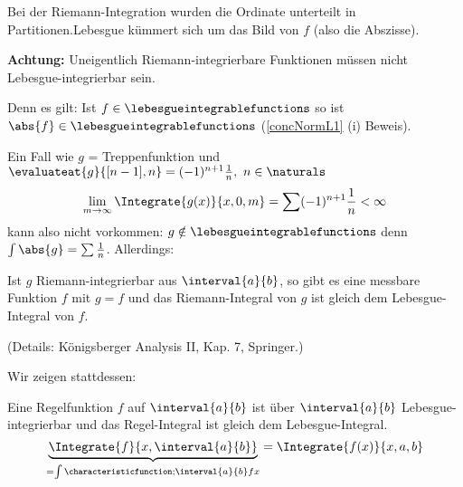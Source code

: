 \begin{erinnerung*}
  Bei der Riemann-Integration wurden die Ordinate unterteilt in Partitionen.Lebesgue kümmert sich um das Bild von \(f\) (also die Abszisse).
\end{erinnerung*}

\textbf{Achtung:} Uneigentlich Riemann-integrierbare Funktionen müssen nicht Lebesgue-integrierbar sein.

Denn es gilt: Ist \(f\in \lebesgueintegrablefunctions\) so ist \(\abs{f}\in \lebesgueintegrablefunctions\) (\ref{concNormL1} (i) Beweis).

Ein Fall wie \(g\) = Treppenfunktion und \(\evaluateat{g}{[n-1],n}=(-1)^{n+1}\frac{1}{n},\ n\in\naturals\)
\begin{equation*}
    \lim_{m\to\infty}\Integrate{g(x)}{x,0,m}=\sum(-1)^{n+1}\frac{1}{n}< \infty 
\end{equation*}
kann also nicht vorkommen: \(g\notin \lebesgueintegrablefunctions\) denn \(\int\abs{g}=\sum\frac{1}{n}\). Allerdings:

\begin{satz}
    \label{riemann_integrierbar_messbar}
    Ist \(g\) Riemann-integrierbar aus \(\interval{a}{b}\), so gibt es eine messbare Funktion \(f\) mit \(g=f\) \fue und das Riemann-Integral von \(g\) ist gleich dem Lebesgue-Integral von \(f\).
\end{satz}

(Details: Königsberger Analysis II, Kap. 7, Springer.)

Wir zeigen stattdessen:

\begin{satz}
    \label{theoRegelFkt} %
    Eine Regelfunktion \(f\) auf \(\interval{a}{b}\) ist über \(\interval{a}{b}\) Lebesgue-integrierbar und das Regel-Integral ist gleich dem Lebesgue-Integral.
    \begin{equation*}
        \underbrace{\Integrate{f}{x,\interval{a}{b}}}_{=\int{\characteristicfunction;{\interval{a}{b}}f{x}}}=\Integrate{f(x)}{x,a,b}
    \end{equation*}
\end{satz}

